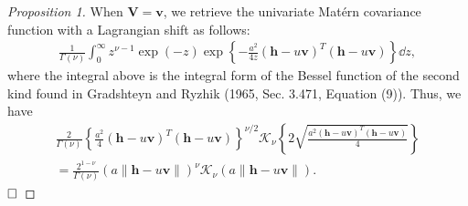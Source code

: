 \documentclass[12pt]{article}
\newcommand{\0}{\mathbf{0}}
\newtheorem{proof}{Proof}
\begin{document}
\begin{proof}[Proposition 1]
When $\mathbf{V}=\mathbf{v}$, we retrieve the univariate Mat\'{e}rn covariance function with a Lagrangian shift as follows:
\begin{eqnarray*}
\frac{1}{ \Gamma(\nu)} \int_0^{\infty}z^{\nu-1} \exp\left(-z\right) \exp\left\{-\frac{a^2}{4z}(\mathbf{h}-u\mathbf{v})^T(\mathbf{h}-u\mathbf{v})\right\}\dd z, 
\end{eqnarray*}
where the integral above is the integral form of the Bessel function of the second kind found in Gradshteyn
and Ryzhik (1965, Sec. 3.471, Equation (9)).\nocite{gradshteyn2014table} Thus, we have 
\begin{multline*}
\frac{2}{ \Gamma(\nu)} \left\{\frac{a^2}{4}(\mathbf{h}-u\mathbf{v})^T(\mathbf{h}-u\mathbf{v})\right\}^{\nu/2}\mathcal{K}_{\nu}\left\{2\sqrt{\frac{a^2(\mathbf{h}-u\mathbf{v})^T(\mathbf{h}-u\mathbf{v})}{4}}\right\}\\
=\frac{2^{1-\nu}}{ \Gamma(\nu)} \left(a\|\mathbf{h}-u\mathbf{v}\|\right)^{\nu}\mathcal{K}_{\nu}\left(a\|\mathbf{h}-u\mathbf{v}\|\right).
\end{multline*}
$\hfill \Box$
\end{proof}
\endgroup
\end{document}
